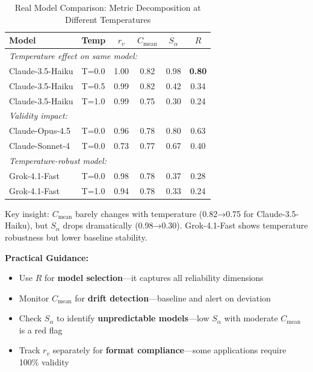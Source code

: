 \documentclass{article}
\theoremstyle{plain}
\theoremstyle{definition}
\begin{document}
\begin{table}[h]
\centering
\caption{Real Model Comparison: Metric Decomposition at Different Temperatures}
\label{tab:real-metric-examples}
\scriptsize
\begin{tabular}{@{}llcccc@{}}
\toprule
\textbf{Model} & \textbf{Temp} & $r_v$ & $C_{\text{mean}}$ & $S_\alpha$ & $R$ \\
\midrule
\multicolumn{6}{l}{\textit{Temperature effect on same model:}} \\
Claude-3.5-Haiku & T=0.0 & 1.00 & 0.82 & 0.98 & \textbf{0.80} \\
Claude-3.5-Haiku & T=0.5 & 0.99 & 0.82 & 0.42 & 0.34 \\
Claude-3.5-Haiku & T=1.0 & 0.99 & 0.75 & 0.30 & 0.24 \\
\midrule
\multicolumn{6}{l}{\textit{Validity impact:}} \\
Claude-Opus-4.5 & T=0.0 & 0.96 & 0.78 & 0.80 & 0.63 \\
Claude-Sonnet-4 & T=0.0 & 0.73 & 0.77 & 0.67 & 0.40 \\
\midrule
\multicolumn{6}{l}{\textit{Temperature-robust model:}} \\
Grok-4.1-Fast & T=0.0 & 0.98 & 0.78 & 0.37 & 0.28 \\
Grok-4.1-Fast & T=1.0 & 0.94 & 0.78 & 0.33 & 0.24 \\
\bottomrule
\end{tabular}

\vspace{0.3em}
\raggedright\scriptsize Key insight: $C_{\text{mean}}$ barely changes with temperature (0.82→0.75 for Claude-3.5-Haiku), but $S_\alpha$ drops dramatically (0.98→0.30). Grok-4.1-Fast shows temperature robustness but lower baseline stability.
\end{table}

\textbf{Practical Guidance:}
\begin{itemize}[leftmargin=*, nosep]
\item Use $R$ for \textbf{model selection}---it captures all reliability dimensions
\item Monitor $C_{\text{mean}}$ for \textbf{drift detection}---baseline and alert on deviation
\item Check $S_\alpha$ to identify \textbf{unpredictable models}---low $S_\alpha$ with moderate $C_{\text{mean}}$ is a red flag
\item Track $r_v$ separately for \textbf{format compliance}---some applications require 100\% validity
\end{itemize}
\end{document}
